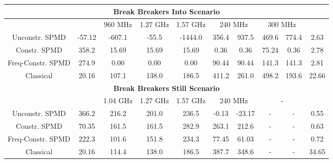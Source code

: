 \begin{table*}[tp]
{\begin{tabular}{|c|c|c|c|c|c|c|c|c|c|}
        
    \multicolumn{10}{|c|}{\bf Break Breakers Into Scenario} \\
        \hline
        &  & 960 MHz & 1.27 GHz & 1.57 GHz & \multicolumn{2}{c|}{240 MHz} & \multicolumn{2}{c|}{300 MHz} & \\
        \hline
        Unconstr. SPMD & -57.12 & -607.1 & -55.5 & -1444.0 & 356.4 & 937.5 & 469.6 & 774.4 & 2.63 \\
        Constr. SPMD & 358.2 & 15.69 & 15.69 & 15.69 & 0.36 & 0.36 & 75.24 & 0.36 & 2.78 \\
        Freq-Constr. SPMD& 274.9 & 0.00 & 0.00 & 0.00 & 90.44 & 90.44 & 141.3 & 141.3 & 2.81 \\
        \hline
        Classical & 20.16 & 107.1 & 138.0 & 186.5 & 411.2 & 261.0 & 498.2 & 193.6 & 22.66 \\
        \hline

    \multicolumn{10}{|c|}{\bf Break Breakers Still Scenario} \\
        \hline
        &  & 1.04 GHz & 1.27 GHz & 1.57 GHz & \multicolumn{2}{c|}{240 MHz} & \multicolumn{2}{c|}{-} & \\
       \hline
        Unconstr. SPMD & 366.2 & 216.2 & 201.0 & 236.5 & -0.13 & -23.17 & - & - & 0.55 \\
        Constr. SPMD & 70.35 & 161.5 & 161.5 & 282.9 & 263.1 & 212.6 & - & - & 0.63 \\
        Freq-Constr. SPMD& 222.3 & 101.6 & 151.8 & 234.3 & 77.45 & 61.03 & - & - & 0.72 \\
        \hline
        Classical & 20.16 & 114.4 & 138.0 & 186.5 & 387.7 & 348.6 & - & - & 34.65 \\
        \hline

\end{tabular}
}
\label{tab:nexus6macro}
\vspace{-0.1in}
\end{table*}

